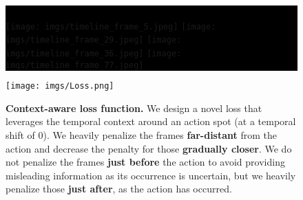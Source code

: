 \documentclass[10pt,twocolumn,letterpaper]{article}
\begin{document}
\begin{figure}[t]
    \centering
\setlength{\fboxsep}{0pt}\colorbox{black}{\begin{minipage}{\linewidth}
            \rule{0mm}{4.8mm}
            \redbox\redbox\redbox\redbox\orangebox
            \orangebox\graybox\graybox\graybox\graybox
            \greenbox\greenbox\greenbox\greenbox\orangebox
            \orangebox\redbox\redbox\redbox\redbox
            \null\\
            \null\hfill
            \texttt{[image: imgs/timeline\_frame\_5.jpeg]}
            \texttt{[image: imgs/timeline\_frame\_29.jpeg]}
            \texttt{[image: imgs/timeline\_frame\_36.jpeg]}
            \texttt{[image: imgs/timeline\_frame\_77.jpeg]}
            \null\hfill
            \\[1mm]\null
            \redbox\redbox\redbox\redbox\orangebox
            \orangebox\graybox\graybox\graybox\graybox
            \greenbox\greenbox\greenbox\greenbox\orangebox
            \orangebox\redbox\redbox\redbox\redbox
            \null
        \end{minipage}
        }
    \texttt{[image: imgs/Loss.png]}
    \caption{
    \textbf{Context-aware loss function.}
We design a novel loss that leverages the temporal context around an action spot (at a temporal shift of $0$).
    We heavily penalize the frames {\color{myred}\textbf{far-distant}} from the action and decrease the penalty for those {\color{myorange}\textbf{gradually closer}}. 
We do not penalize the frames {\color{mygray}\textbf{just before}} the action to avoid providing misleading information as its occurrence is uncertain, but we heavily penalize those {\color{mygreen}\textbf{just after}}, as the action has occurred.
}
    \label{fig:Loss}
\end{figure}
\end{document}
